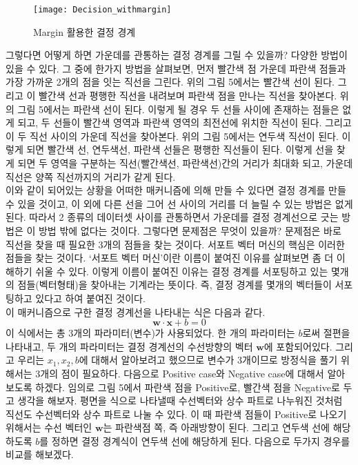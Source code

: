 \documentclass[a4paper]{oblivoir}
\begin{document}
\begin{figure}[ht]\centering
\texttt{[image: Decision\_withmargin]}\caption{Margin 활용한 결정 경계}\label{Fig:5-5}
\end{figure}
\indent 그렇다면 어떻게 하면 가운데를 관통하는 결정 경계를 그릴 수 있을까? 다양한 방법이 있을 수 있다. 그 중에 한가지 방법을 살펴보면, 먼저 빨간색 점 가운데 파란색 점들과 가장 가까운 2개의 점을 잇는 직선을 그린다. 위의 그림 5에서는 빨간색 선이 된다. 그리고 이 빨간색 선과 평행한 직선을 내려보며 파란색 점을 만나는 직선을 찾아본다. 위의 그림 5에서는 파란색 선이 된다. 이렇게 될 경우 두 선들 사이에 존재하는 점들은 없게 되고, 두 선들이 빨간색 영역과 파란색 영역의 최전선에 위치한 직선이 된다. 그리고 이 두 직선 사이의 가운데 직선을 찾아본다. 위의 그림 5에서는 연두색 직선이 된다. 이렇게 되면 빨간색 선, 연두색선, 파란색 선들은 평행한 직선들이 된다. 이렇게 선을 찾게 되면 두 영역을 구분하는 직선(빨간색선, 파란색선)간의 거리가 최대화 되고, 가운데 직선은 양쪽 직선까지의 거리가 같게 된다.\\
\indent 이와 같이 되어있는 상황을 어떠한 매커니즘에 의해 만들 수 있다면 결정 경계를 만들 수 있을 것이고, 이 외에 다른 선을 그어 선 사이의 거리를 더 늘릴 수 있는 방법은 없게 된다. 따라서 2 종류의 데이터셋 사이를 관통하면서 가운데를 결정 경계선으로 긋는 방법은 이 방법 밖에 없다는 것이다. 그렇다면 문제점은 무엇이 있을까? 문제점은 바로 직선을 찾을 때 필요한 3개의 점들을 찾는 것이다. 서포트 벡터 머신의 핵심은 이러한 점들을 찾는 것이다. `서포트 벡터 머신'이란 이름이 붙여진 이유를 살펴보면 좀 더 이해하기 쉬울 수 있다. 이렇게 이름이 붙여진 이유는 결정 경계를 서포팅하고 있는 몇개의 점들(벡터형태)을 찾아내는 기계라는 뜻이다. 즉, 결정 경계를 몇개의 벡터들이 서포팅하고 있다고 하여 붙여진 것이다.\\
\indent 이 매커니즘으로 구한 결정 경계선을 나타내는 식은 다음과 같다. 
\begin{equation}
\mathbf{w\cdot x}+b=0
\label{eq:5-4}
\end{equation}
\indent 이 식에서는 총 3개의 파라미터(변수)가 사용되었다. 한 개의 파라미터는 $b$로써 절편을 나타내고, 두 개의 파라미터는 결정 경계선의 수선방향의 벡터 $\mathbf{w}$에 포함되어있다. 그리고 우리는 $x_1,x_2,b$에 대해서 알아보려고 했으므로 변수가 3개이므로 방정식을 풀기 위해서는 3개의 점이 필요하다. 다음으로 Positive case와 Negative case에 대해서 알아보도록 하겠다. 임의로 그림 5에서 파란색 점을 Positive로, 빨간색 점을 Negative로 두고 생각을 해보자. 평면을 식으로 나타낼때 수선벡터와 상수 파트로 나누워진 것처럼 직선도 수선벡터와 상수 파트로 나눌 수 있다. 이 때 파란색 점들이 Positive로 나오기 위해서는 수선 벡터인 $\mathbf{w}$는 파란색점 쪽, 즉 아래방향이 된다. 그리고 연두색 선에 해당하도록 $b$를 정하면 결정 경계식이 연두색 선에 해당하게 된다. 다음으로 두가지 경우를 비교를 해보겠다.
\end{document}
